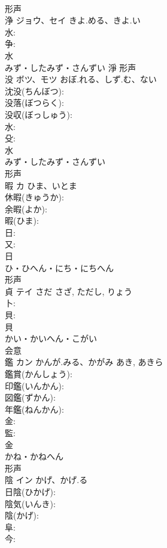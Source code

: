 \documentclass[8pt]{extreport}
\begin{document}
\begin{CJK}{UTF8}{min}
\\	形声 
\\	浄	ジョウ、セイ	きよ.める、きよ.い		
\\	水: 
\\	争: 
\\	水	
\\	みず・したみず・さんずい	淨	形声 
\\	没	ボツ、モツ	おぼ.れる、しず.む、ない		
\\	沈没(ちんぼつ): 
\\	没落(ぼつらく): 
\\	没収(ぼっしゅう): 
\\	水: 
\\	殳: 
\\	水	
\\	みず・したみず・さんずい	
\\	形声 
\\	暇	カ	ひま、いとま		
\\	休暇(きゅうか): 
\\	余暇(よか): 
\\	暇(ひま): 
\\	日: 
\\	又: 
\\	日	
\\	ひ・ひへん・にち・にちへん	
\\	形声 
\\	貞	テイ	さだ	さざ, ただし, りょう	
\\	卜: 
\\	貝: 
\\	貝	
\\	かい・かいへん・こがい	
\\	会意 
\\	鑑	カン	かんが.みる、かがみ	あき, あきら	
\\	鑑賞(かんしょう): 
\\	印鑑(いんかん): 
\\	図鑑(ずかん): 
\\	年鑑(ねんかん): 
\\	金: 
\\	監: 
\\	金	
\\	かね・かねへん	
\\	形声 
\\	陰	イン	かげ、かげ.る		
\\	日陰(ひかげ): 
\\	陰気(いんき): 
\\	陰(かげ): 
\\	阜: 
\\	今: 

\end{CJK}
\end{document}
